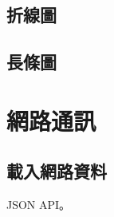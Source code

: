 \documentclass[a4paper,12pt]{book}
\begin{document}
\chapter{折線圖}

\chapter{長條圖}

\part{網路通訊}

\chapter{載入網路資料}

JSON API。

\backmatter



\end{document}

